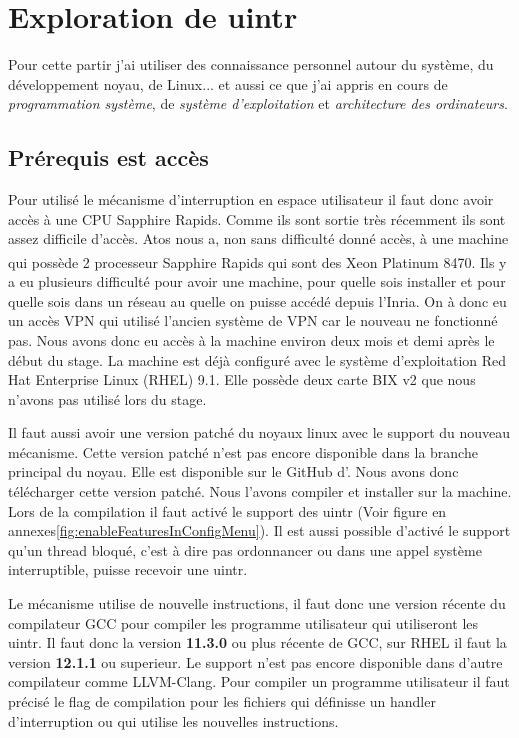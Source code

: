 \section{Exploration de uintr}

Pour cette partir j'ai utiliser des connaissance personnel autour du système, du développement noyau, de Linux... et aussi ce que j'ai appris en cours de \emph{programmation système}, de \emph{système d'exploitation} et \emph{architecture des ordinateurs}.

\subsection{Prérequis est accès}

Pour utilisé le mécanisme d'interruption en espace utilisateur il faut donc avoir accès à une CPU \intel{} Sapphire Rapids.
Comme ils sont sortie très récemment ils sont assez difficile d'accès.
Atos nous a, non sans difficulté donné accès, à une machine qui possède 2 processeur \intel{} Sapphire Rapids qui sont des \intel{} Xeon\textsuperscript{\tiny{\textregistered}} Platinum 8470.
Ils y a eu plusieurs difficulté pour avoir une machine, pour quelle sois installer et pour quelle sois dans un réseau au quelle on puisse accédé depuis l'Inria.
On à donc eu un accès VPN qui utilisé l'ancien système de VPN car le nouveau ne fonctionné pas.
Nous avons donc eu accès à la machine environ deux mois et demi après le début du stage.
La machine est déjà configuré avec le système d'exploitation Red Hat Enterprise Linux (RHEL) 9.1.
Elle possède deux carte BIX v2 que nous n'avons pas utilisé lors du stage.

Il faut aussi avoir une version patché du noyaux linux avec le support du nouveau mécanisme.
Cette version patché n'est pas encore disponible dans la branche principal du noyau.
Elle est disponible sur le GitHub d'\intel{}. Nous avons donc télécharger cette version patché.
Nous l'avons compiler et installer sur la machine.
Lors de la compilation il faut activé le support des uintr (Voir figure en annexes\ref{fig:enableFeaturesInConfigMenu}).
Il est aussi possible d'activé le support qu'un thread bloqué, c'est à dire pas ordonnancer ou dans une appel système interruptible, puisse recevoir une uintr.

Le mécanisme utilise de nouvelle instructions, il faut donc une version récente du compilateur GCC pour compiler les programme utilisateur qui utiliseront les uintr.
Il faut donc la version \textbf{11.3.0} ou plus récente de GCC, sur RHEL il faut la version \textbf{12.1.1} ou superieur.
Le support n'est pas encore disponible dans d'autre compilateur comme LLVM-Clang.
Pour compiler un programme utilisateur il faut précisé le flag de compilation  pour les fichiers qui définisse un handler d'interruption ou qui utilise les nouvelles instructions.

